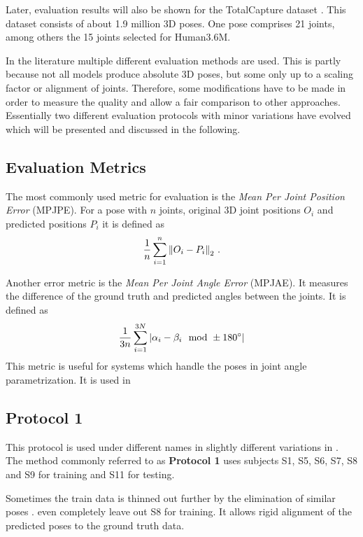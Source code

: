 Later, evaluation results will also be shown for the TotalCapture dataset \cite{trumble17}.
This dataset consists of about 1.9 million 3D poses.
One pose comprises 21 joints, among others the 15 joints selected for Human3.6M.

In the literature multiple different evaluation methods are used. 
This is partly because not all models produce absolute 3D poses, but some only up to a scaling factor or alignment of joints.
Therefore, some modifications have to be made in order to measure the quality and allow a fair comparison to other approaches.
Essentially two different evaluation protocols with minor variations have evolved which will be presented and discussed in the following.

\subsection{Evaluation Metrics}
The most commonly used metric for evaluation is the \textit{Mean Per Joint Position Error} (MPJPE).
For a pose with $n$ joints, original 3D joint positions $O_i$ and predicted positions $P_i$ it is defined as
\begin{equation}
	\frac{1}{n} \sum_{i = 1}^{n}  \norm{O_i - P_i}_2 \ .
\end{equation}

Another error metric is the \textit{Mean Per Joint Angle Error} (MPJAE). It measures the difference of the ground truth and predicted angles between the joints.
It is defined as
\begin{equation}
	\frac{1}{3n} \sum_{i = 1}^{3N} \abs{\alpha_i - \beta_i \mod \pm 180\degree}
\end{equation}
This metric is useful for systems which handle the poses in joint angle parametrization. It is used in 

\subsection{Protocol 1}

This protocol is used under different names in slightly different variations in \cite{sun17, drover18, moreno-noguer16, yasin16, kostrikov14, tome17}.
The method commonly referred to as \textbf{Protocol 1} uses subjects S1, S5, S6, S7, S8 and S9 for training and S11 for testing.

Sometimes the train data is thinned out further by the elimination of similar poses \cite{yasin16}.
\citet{drover18} even completely leave out S8 for training.
It allows rigid alignment \cite{drover18, yasin16, kostrikov14, sun17, tome17, chen17} of the predicted poses to the ground truth data.


